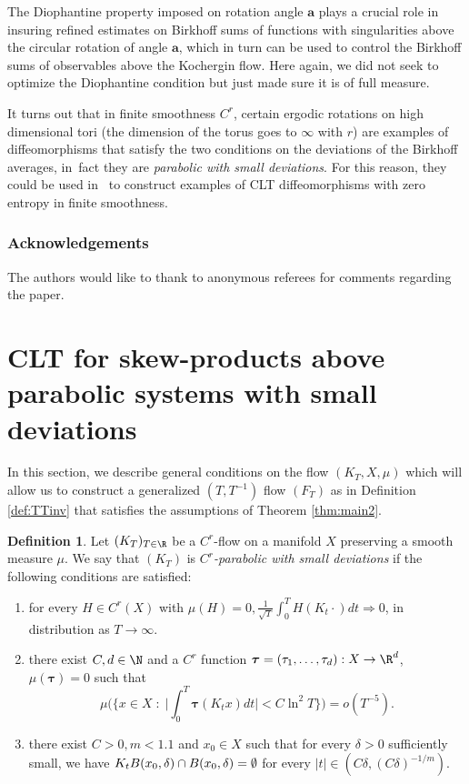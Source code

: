 \documentclass[JEP,XML,SOM,Unicode,NoFloatCountersInSection]{cedram}
\let\DS\relax
\newcommand\ba{\boldsymbol{a}}
\newcommand\btau{{\boldsymbol{\tau}}}
\theoremstyle{definition}
\newtheorem{definition}{Definition}
\theoremstyle{plain}
\begin{document}
The Diophantine property imposed on rotation angle
$\ba$ plays a crucial role in insuring refined estimates on Birkhoff sums of functions with singularities above the circular rotation of angle $\ba$, which in turn can be used to control the Birkhoff sums of observables above the Kochergin flow. Here again, we did not seek to optimize the Diophantine condition but just made sure it is of full measure.

It turns out that in finite smoothness $C^r$, certain ergodic rotations on high dimensional tori (the dimension of the torus goes to $\infty$ with $r$) are examples of diffeomorphisms that satisfy the two conditions on the deviations of the Birkhoff averages, in~fact they are \emph{parabolic with small deviations}. For this reason, they could be used in~\cite{DDKN} to construct examples of CLT diffeomorphisms with zero entropy in finite smoothness.

\subsubsection*{Acknowledgements}
The authors would like to thank to anonymous referees for comments regarding the paper.

\section{CLT for skew-products above parabolic systems with small deviations}
\label{ScCLT-Par}

In this section, we describe general conditions on the flow $(K_T,X,\mu)$ which will allow us to construct a generalized $(T,T^{-1})$ flow $(F_T)$ as in Definition \ref{def:TTinv} that satisfies the assumptions of Theorem \ref{thm:main2}.

\begin{definition}\label{def:parflow} Let $(K_T)_{T\in \R}$ be a $C^r$-flow on a manifold $X$ preserving a smooth measure $\mu$. We say that $(K_T)$ is \emph{$C^r$-parabolic with small deviations}
if the following conditions are satisfied:
\begin{enumerate}\renewcommand{\theenumi}{\textup{S}\arabic{enumi}}
\item\label{S1}
for every $H\in C^r(X)$ with $\mu(H)=0$$,
\frac{1}{\sqrt{T}}\int_0^T H(K_t\cdot )dt \Rightarrow 0$,
in distribution as $T\to\infty$.
\item\label{S2}
there exist $C,d\in \N$ and a $C^r$ function ${\btau}=(\tau_1,\ldots,\tau_d):X\to \R^d$, $\mu(\btau)=0$ such that
\[
\mu\Big(\{x\in X\;:\; \Big|\int_0^T\btau(K_tx)dt\Big|<C\ln^2 T \}\Big)=o(T^{-5}).
\]
\item\label{S3}
there exist $C>0, m <1.1$ and $x_0\in X$ such that for every $\delta>0$ sufficiently small, we have
$\DS
K_tB(x_0,\delta)\cap B(x_0,\delta)=\emptyset
$
for every $|t|\in (C\delta, (C\delta)^{-1/m})$.
\end{enumerate}
\end{definition}
\end{document}
